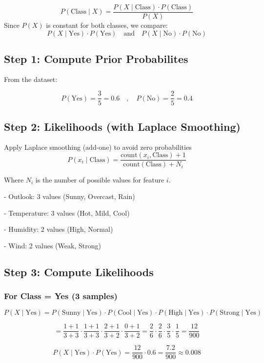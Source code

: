 \documentclass{article}
\begin{document}
$$
P(\text{Class} \mid X) = \frac{P(X \mid \text{Class}) \cdot P(\text{Class})}{P(X)}
$$
Since $P(X)$ is constant for both classes, we compare:
$$
P(X \mid \text{Yes}) \cdot P(\text{Yes}) \quad \text{and} \quad P(X \mid \text{No}) \cdot P(\text{No})
$$

\subsection*{Step 1: Compute Prior Probabilites}
From the dataset: 

$$
P(\text{Yes}) = \frac{3}{5} = 0.6
\quad , \quad
P(\text{No}) = \frac{2}{5} = 0.4
$$

\subsection*{Step 2: Likelihoods (with Laplace Smoothing)}

Apply Laplace smoothing (add-one) to avoid zero probabilities
$$
P(x_i \mid \text{Class}) = \frac{\text{count}(x_i, \text{Class}) + 1}{\text{count}(\text{Class}) + N_i}
$$

Where $N_i$ is the number of possible values for feature $i$.

- Outlook: 3 values (Sunny, Overcast, Rain)

- Temperature: 3 values (Hot, Mild, Cool)

- Humidity: 2 values (High, Normal)

- Wind: 2 values (Weak, Strong)

\subsection*{Step 3: Compute Likelihoods}

\subsubsection*{For Class = Yes (3 samples)}

$$
P(X \mid \text{Yes}) = P(\text{Sunny} \mid \text{Yes}) \cdot P(\text{Cool} \mid \text{Yes}) \cdot P(\text{High} \mid \text{Yes}) \cdot P(\text{Strong} \mid \text{Yes})
$$

$$
= \frac{1+1}{3+3} \cdot \frac{1+1}{3+3} \cdot \frac{2+1}{3+2} \cdot \frac{0+1}{3+2}
= \frac{2}{6} \cdot \frac{2}{6} \cdot \frac{3}{5} \cdot \frac{1}{5} = \frac{12}{900}
$$

$$
P(X \mid \text{Yes}) \cdot P(\text{Yes}) = \frac{12}{900} \cdot 0.6 = \frac{7.2}{900} \approx 0.008
$$
\end{document}
